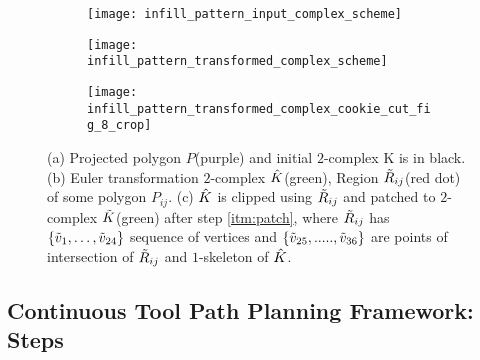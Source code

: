 \begin{figure}[htp!] 
  \centering
  \begin{subfigure}[t]{1.6in}
    \centering
    \texttt{[image: infill\_pattern\_input\_complex\_scheme]}
    \caption{\label{fig:printingprocessa}}
  \end{subfigure}
  \hspace*{0.3in}
  \begin{subfigure}[t]{1.6in}
    \centering
    \texttt{[image: infill\_pattern\_transformed\_complex\_scheme]}
    \caption{\label{fig:printingprocessb}}
  \end{subfigure}	
  \begin{subfigure}[t]{1.6in}
    \centering
    \texttt{[image: infill\_pattern\_transformed\_complex\_cookie\_cut\_fig\_8\_crop]}
    \caption{\label{fig:printingprocessc}}
  \end{subfigure}
  
  \caption{\label{fig:printingprocess}
    (a) Projected polygon $P$(purple) and initial $2$-complex K is in black. (b) Euler transformation $2$-complex $\hat{K}$(green), Region $\tilde{R}_{ij}$(red dot) of some polygon $P_{ij}$. (c) $\hat{K}$ is clipped using $\tilde{R}_{ij}$ and patched to $2$-complex $\tilde{K}$(green) after step \ref{itm:patch}, where $\tilde{R}_{ij}$ has  $\{\tilde{v}_1, \dots , \tilde{v}_{24}\}$ sequence of vertices and $\{\tilde{v}_{25}, ..... , \tilde{v}_{36}\}$ are points of intersection of $\tilde{R}_{ij}$ and $1$-skeleton of $\hat{K}$.
  }
\end{figure}

\vspace*{-0.05in}
\subsection{Continuous Tool Path Planning Framework: Steps} \label{ssec:steps}
\vspace*{-0.05in}

